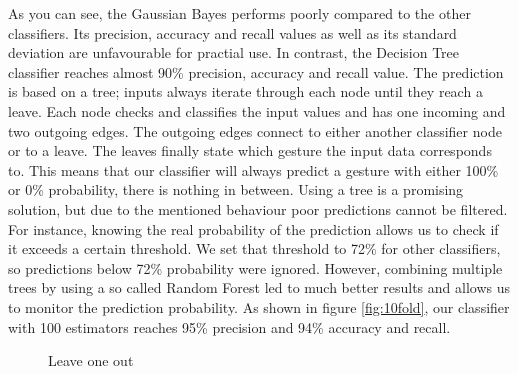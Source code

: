 As you can see, the Gaussian Bayes performs poorly compared to the other classifiers. Its precision, accuracy and recall values as well as its standard deviation are unfavourable for practial use. In contrast, the Decision Tree classifier reaches almost 90\% precision, accuracy and recall value. The prediction is based on a tree; inputs always iterate through each node until they reach a leave. Each node checks and classifies the input values and has one incoming and two outgoing edges. The outgoing edges connect to either another classifier node or to a leave. The leaves finally state which gesture the input data corresponds to. This means that our classifier will always predict a gesture with either 100\% or 0\% probability, there is nothing in between. Using a tree is a promising solution, but due to the mentioned behaviour poor predictions cannot be filtered. For instance, knowing the real probability of the prediction allows us to check if it exceeds a certain threshold. We set that threshold to 72\% for other classifiers, so predictions below 72\% probability were ignored. However, combining multiple trees by using a so called Random Forest led to much better results and allows us to monitor the prediction probability. As shown in figure \ref{fig:10fold}, our classifier with 100 estimators reaches 95\% precision and 94\% accuracy and recall. 
\newline
\begin{figure}[H]
\caption{Leave one out}\label{fig:loo}
\end{figure}

